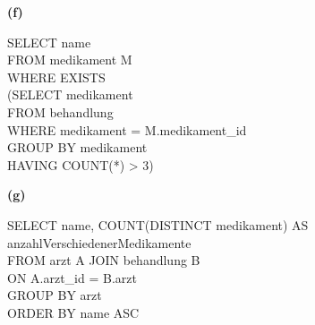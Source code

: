 \documentclass[11pt, a4paper]{article}
\newcommand{\aufgabenteil}[1] {\textbf{(#1)}}
\begin{document}
\aufgabenteil{f}
\begin{adjustwidth}{20pt}{20pt}
\begin{tt}
SELECT name \\
FROM medikament M \\
WHERE EXISTS \\
  (SELECT medikament \\
   FROM behandlung \\
   WHERE medikament = M.medikament\_id \\
   GROUP BY medikament \\
   HAVING COUNT(*) > 3) \\
\end{tt}
\end{adjustwidth}
\aufgabenteil{g}
\begin{adjustwidth}{20pt}{20pt}
\begin{tt}
SELECT name, COUNT(DISTINCT medikament) AS anzahlVerschiedenerMedikamente \\
FROM arzt A JOIN behandlung B \\
ON A.arzt\_id = B.arzt \\
GROUP BY arzt \\
ORDER BY name ASC \\
\end{tt}
\end{adjustwidth}
\end{document}
